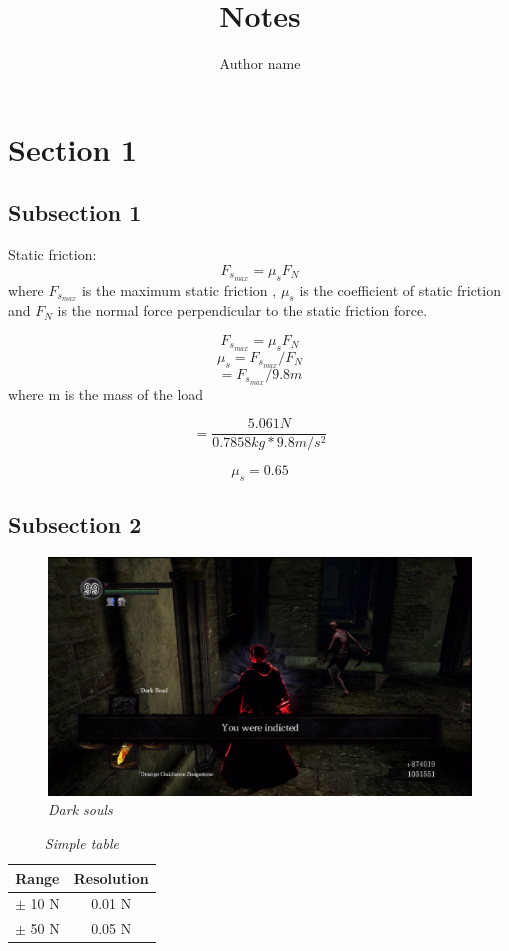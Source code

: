 \documentclass[12pt,a4paper]{article}
\title{\Huge {Notes}}
\author{Author name}
\date{}
\begin{document}
\maketitle
\tableofcontents
\thispagestyle{empty}      %
\newpage
\setcounter{page}{1}        %

\section{Section 1}
\subsection{Subsection 1}
Static friction:
$$
F_{s_{max}} = \mu_s F_N
$$
where $F_{s_{max}}$ is the maximum static friction , $\mu_s$ is the coefficient of static friction and $F_N$ is the normal force perpendicular to the static friction force.

$$F_{s_{max}} = \mu_s F_N$$
$$\mu_s = F_{s_{max}}/F_N$$
$$    = F_{s_{max}}/9.8m $$where m is the mass of the load

$$ =  \frac{5.061 N}{0.7858 kg * 9.8 m/s^2} $$

$$ \mu_s = 0.65 $$

\subsection{Subsection 2}
\begin{figure}[H]
\includegraphics[width=\linewidth]{test}
\caption{\textit{Dark souls}}
\label{Indictment in dark souls} 
\end{figure}

\begin{table}[H]
\centering
\begin{tabular}{|c|c|}
\hline
\textbf{Range} & \textbf{Resolution} \\ 
\hline
$\pm$ 10 N	& 0.01 N \\
\hline
$\pm$ 50 N	& 0.05 N \\
\hline
\end{tabular} 
\caption{\textit{Simple table}}
\label{table:Force sensor resolution}
\end{table}
\end{document}
